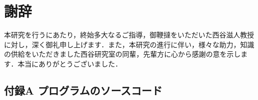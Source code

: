 \chapter{謝辞}\label{ux8b1dux8f9e}

    本研究を行うにあたり，終始多大なるご指導，御鞭撻をいただいた西谷滋人教授に対し，深く御礼申し上げます．また，本研究の進行に伴い，様々な助力，知識の供給をいただきました西谷研究室の同輩，先輩方に心から感謝の意を示します．本当にありがとうございました．

    \section{付録A
プログラムのソースコード}\label{ux4ed8ux9332a-ux30d7ux30edux30b0ux30e9ux30e0ux306eux30bdux30fcux30b9ux30b3ux30fcux30c9}

